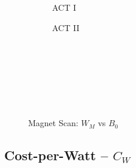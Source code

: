 \begin{figure*}[h!]
\begin{subfigure}[t]{0.45\textwidth}
\begin{adjustbox}{width=\textwidth}
      \Large
      
    \end{adjustbox}
        \caption{ACT I}
    \end{subfigure}
    \hfill
    \begin{subfigure}[t]{0.45\textwidth}
        \centering
    \begin{adjustbox}{width=\textwidth}
      \Large
      
    \end{adjustbox}
        \caption{ACT II}
    \end{subfigure}
    \hfill \hfill ~\\ ~\\ ~\\ ~\\
  \caption[]{Magnet Scan: $W_M$ vs $B_0$} ~\\
\end{figure*}


\clearpage

\newpage

\subsection*{ Cost-per-Watt -- $C_W$ }
  \label{subsection:scan_C_W}

